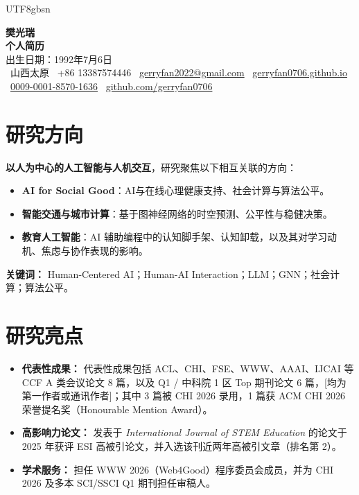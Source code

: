 \documentclass[a4paper,10pt]{article}
\newcommand{\cvlabel}[1]{\textbf{#1}}
\begin{document}
\ifPDFTeX
\begin{CJK*}{UTF8}{gbsn}
\fi

\pagestyle{empty}

\begin{center}
    \textbf{\LARGE 樊光瑞}\\[5pt]
    \textbf{\large 个人简历}\\[3pt]
    出生日期：1992年7月6日\\[2pt]
    \faMapMarker*~山西太原 \quad
    \faPhone~+86 13387574446 \quad
    \faEnvelope~\href{mailto:gerryfan2022@gmail.com}{gerryfan2022@gmail.com} \quad
    \faGlobe~\href{https://gerryfan0706.github.io}{gerryfan0706.github.io}\\[2pt]
    \faOrcid~\href{https://orcid.org/0009-0001-8570-1636}{0009-0001-8570-1636} \quad
    \faGithub~\href{https://github.com/gerryfan0706}{github.com/gerryfan0706}
\end{center}

\section*{研究方向}

\cvlabel{以人为中心的人工智能与人机交互}，研究聚焦以下相互关联的方向：
\begin{itemize}[leftmargin=*]
  \item \cvlabel{AI for Social Good}：AI与在线心理健康支持、社会计算与算法公平。
  \item \cvlabel{智能交通与城市计算}：基于图神经网络的时空预测、公平性与稳健决策。
  \item \cvlabel{教育人工智能}：AI 辅助编程中的认知脚手架、认知卸载，以及其对学习动机、焦虑与协作表现的影响。
\end{itemize}
\noindent\cvlabel{关键词：} Human-Centered AI；Human-AI Interaction；LLM；GNN；社会计算；算法公平。

\section*{研究亮点}
\begin{itemize}[leftmargin=*]
    \item \cvlabel{代表性成果：} 代表性成果包括 ACL、CHI、FSE、WWW、AAAI、IJCAI 等 CCF A 类会议论文 8 篇，以及 Q1 / 中科院 1 区 Top 期刊论文 6 篇，[均为第一作者或通讯作者]；其中 3 篇被 CHI 2026 录用，1 篇获 ACM CHI 2026 荣誉提名奖（Honourable Mention Award）。
    \item \cvlabel{高影响力论文：} 发表于 \textit{International Journal of STEM Education} 的论文于 2025 年获评 ESI 高被引论文，并入选该刊近两年高被引文章（排名第 2）。
    \item \cvlabel{学术服务：} 担任 WWW 2026（Web4Good）程序委员会成员，并为 CHI 2026 及多本 SCI/SSCI Q1 期刊担任审稿人。
\end{itemize}


\end{CJK*}
\end{document}
